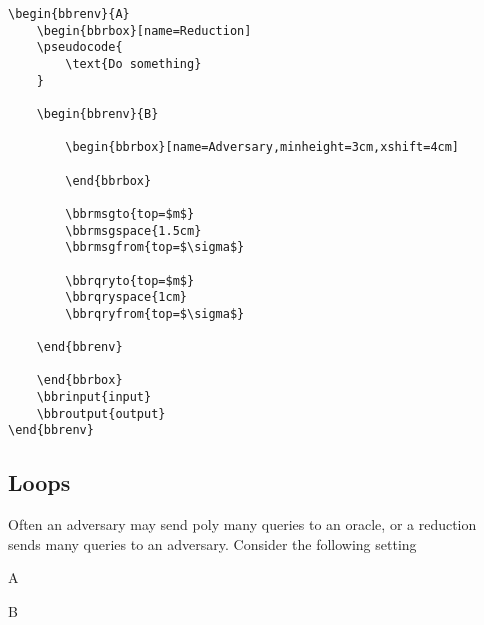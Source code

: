 \documentclass[a4paper]{report}
\begin{document}
\begin{lstlisting}
\begin{bbrenv}{A}
	\begin{bbrbox}[name=Reduction]
	\pseudocode{
		\text{Do something} 
	}

	\begin{bbrenv}{B}

		\begin{bbrbox}[name=Adversary,minheight=3cm,xshift=4cm]

		\end{bbrbox}
		
		\bbrmsgto{top=$m$}
		\bbrmsgspace{1.5cm}
		\bbrmsgfrom{top=$\sigma$}

		\bbrqryto{top=$m$}
		\bbrqryspace{1cm}
		\bbrqryfrom{top=$\sigma$}

	\end{bbrenv}

	\end{bbrbox}
	\bbrinput{input}
	\bbroutput{output}
\end{bbrenv}
\end{lstlisting}


\subsection{Loops}
Often an adversary may send poly many queries to an oracle, or a reduction sends many queries to an adversary.
Consider the following setting

\begin{bbrenv}{A}
	\begin{bbrbox}[name=Reduction]

	\begin{bbrenv}{B}

		\begin{bbrbox}[name=Adversary,minheight=3cm,xshift=4cm]

		\end{bbrbox}
		

	\end{bbrenv}

	\end{bbrbox}
\end{bbrenv}
\end{document}
